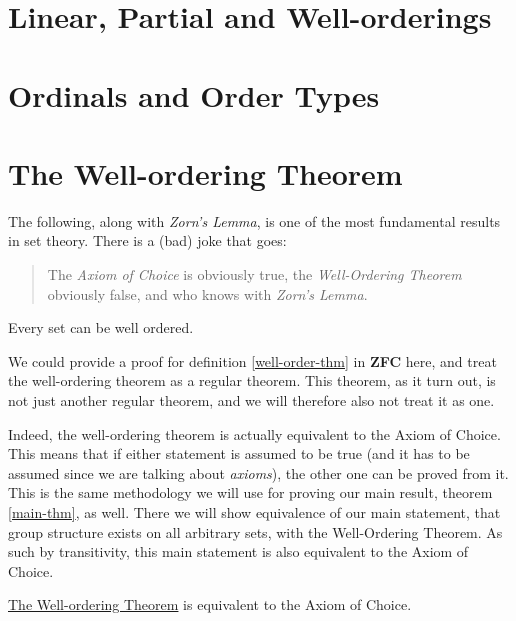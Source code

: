 \documentclass[../../main.tex]{subfiles}
\begin{document}
\section{Linear, Partial and Well-orderings}

\section{Ordinals and Order Types}

\section{The Well-ordering Theorem}
The following, along with \textit{Zorn's Lemma}, is one of the most fundamental results in set theory.
There is a (bad) joke that goes:
\begin{quote} %
    The \textit{Axiom of Choice} is obviously true, the \textit{Well-Ordering Theorem} obviously false, 
    and who knows with \textit{Zorn's Lemma}.
\end{quote}

\begin{definition}\cite[Theorem 15, p.39]{Jec78}\label{well-order-thm}
    \newline Every set can be well ordered.
\end{definition}

We could provide a proof for definition \ref{well-order-thm} in \textbf{ZFC} here, 
and treat the well-ordering theorem as a regular theorem.
This theorem, as it turn out, is not just another regular theorem, and we will therefore also not treat it as one.

Indeed, the well-ordering theorem is actually equivalent to the Axiom of Choice.
This means that if either statement is assumed to be true (and it has to be assumed since we are talking about \textit{axioms}),
the other one can be proved from it.
This is the same methodology we will use for proving our main result, theorem \ref{main-thm}, as well.
There we will show equivalence of our main statement, that group structure exists on all arbitrary sets, with the Well-Ordering Theorem.
As such by transitivity, this main statement is also equivalent to the Axiom of Choice.

\begin{theorem}
    \hyperref[well-order-thm]{The Well-ordering Theorem} is equivalent to the Axiom of Choice. %
\end{theorem}
\end{document}
